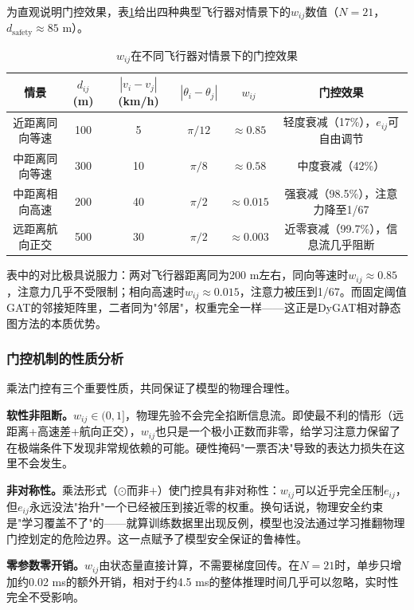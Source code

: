 \documentclass[12pt,a4paper,UTF8]{ctexart}
\begin{document}
为直观说明门控效果，表\ref{tab:gating}给出四种典型飞行器对情景下的$w_{ij}$数值（$N=21$，$d_{\text{safety}}\approx85$ m）。

\begin{table}[H]
    \centering\small
    \caption{$w_{ij}$在不同飞行器对情景下的门控效果}
    \label{tab:gating}
    \begin{tabular}{|c|c|c|c|c|c|}
        \hline
        \textbf{情景} & $d_{ij}$(m) & $|v_i-v_j|$(km/h) & $|\theta_i-\theta_j|$ & $w_{ij}$ & \textbf{门控效果} \\
        \hline
        近距离同向等速 & 100 & 5 & $\pi/12$ & $\approx0.85$ & 轻度衰减（17\%），$e_{ij}$可自由调节 \\
        中距离同向等速 & 300 & 10 & $\pi/8$ & $\approx0.58$ & 中度衰减（42\%） \\
        中距离相向高速 & 200 & 40 & $\pi/2$ & $\approx0.015$ & 强衰减（98.5\%），注意力降至1/67 \\
        远距离航向正交 & 500 & 30 & $\pi/2$ & $\approx0.003$ & 近零衰减（99.7\%），信息流几乎阻断 \\
        \hline
    \end{tabular}
\end{table}

表中的对比极具说服力：两对飞行器距离同为200 m左右，同向等速时$w_{ij}\approx0.85$，注意力几乎不受限制；相向高速时$w_{ij}\approx0.015$，注意力被压到1/67。而固定阈值GAT的邻接矩阵里，二者同为"邻居"，权重完全一样——这正是DyGAT相对静态图方法的本质优势。

\subsubsection{门控机制的性质分析}

乘法门控有三个重要性质，共同保证了模型的物理合理性。

\textbf{软性非阻断。}$w_{ij}\in(0,1]$，物理先验不会完全掐断信息流。即使最不利的情形（远距离+高速差+航向正交），$w_{ij}$也只是一个极小正数而非零，给学习注意力保留了在极端条件下发现非常规依赖的可能。硬性掩码"一票否决"导致的表达力损失在这里不会发生。

\textbf{非对称性。}乘法形式（$\odot$而非$+$）使门控具有非对称性：$w_{ij}$可以近乎完全压制$e_{ij}$，但$e_{ij}$永远没法"抬升"一个已经被压到接近零的权重。换句话说，物理安全约束是"学习覆盖不了"的——就算训练数据里出现反例，模型也没法通过学习推翻物理门控划定的危险边界。这一点赋予了模型安全保证的鲁棒性。

\textbf{零参数零开销。}$w_{ij}$由状态量直接计算，不需要梯度回传。在$N=21$时，单步只增加约0.02 ms的额外开销，相对于约4.5 ms的整体推理时间几乎可以忽略，实时性完全不受影响。
\end{document}
